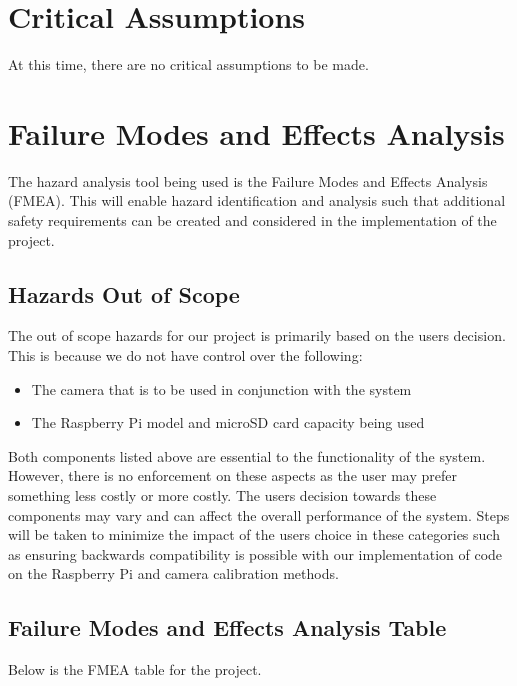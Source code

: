\documentclass{article}
\begin{document}
\section{Critical Assumptions}
At this time, there are no critical assumptions to be made.

\section{Failure Modes and Effects Analysis}

The hazard analysis tool being used is the Failure Modes and Effects Analysis (FMEA). This will enable hazard identification and analysis such that additional safety requirements can 
be created and considered in the implementation of the project.\\

\subsection{Hazards Out of Scope}

The out of scope hazards for our project is primarily based on the user\textquotesingle s decision. This is because we do not have control over the following:\\
\begin{itemize}
    \item The camera that is to be used in conjunction with the system
    \item The Raspberry Pi model and microSD card capacity being used
\end{itemize}

Both components listed above are essential to the functionality of the system. However, there is no enforcement on these aspects as the user may prefer something 
less costly or more costly. The user\textquotesingle s decision towards these components may vary and can affect the overall performance of the system. Steps will be taken to minimize 
the impact of the user\textquotesingle s choice in these categories such as ensuring backwards compatibility is possible with our implementation of code on the Raspberry Pi and camera 
calibration methods.\\

\subsection{Failure Modes and Effects Analysis Table}

Below is the FMEA table for the project.
\end{document}
